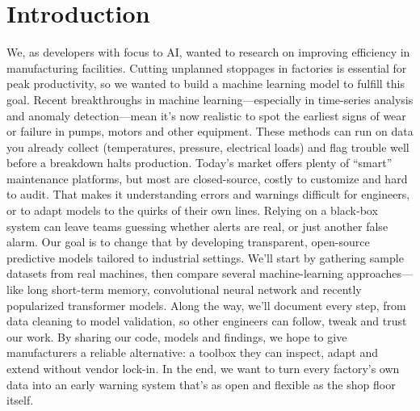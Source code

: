 \chapter{Introduction}
\label{chap:introduction}
\setlength{\parskip}{1em}

We, as developers with focus to AI, wanted to research on improving efficiency in manufacturing facilities. Cutting unplanned stoppages in factories is essential for peak productivity, so we wanted to build a machine learning model to fulfill this goal. Recent breakthroughs in machine learning—especially in time-series analysis and anomaly detection—mean it’s now realistic to spot the earliest signs of wear or failure in pumps, motors and other equipment. These methods can run on data you already collect (temperatures, pressure, electrical loads) and flag trouble well before a breakdown halts production.
Today’s market offers plenty of “smart” maintenance platforms, but most are closed-source, costly to customize and hard to audit. That makes it understanding errors and warnings difficult for engineers, or to adapt models to the quirks of their own lines. Relying on a black-box system can leave teams guessing whether alerts are real, or just another false alarm.
Our goal is to change that by developing transparent, open-source predictive models tailored to industrial settings. We’ll start by gathering sample datasets from real machines, then compare several machine-learning approaches—like long short-term memory, convolutional neural network and recently popularized transformer models. Along the way, we’ll document every step, from data cleaning to model validation, so other engineers can follow, tweak and trust our work.
By sharing our code, models and findings, we hope to give manufacturers a reliable alternative: a toolbox they can inspect, adapt and extend without vendor lock-in. In the end, we want to turn every factory’s own data into an early warning system that’s as open and flexible as the shop floor itself.